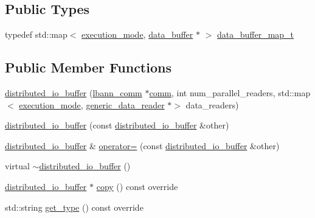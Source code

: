 \subsection*{Public Types}
\begin{DoxyCompactItemize}
\item 
typedef std\+::map$<$ \hyperlink{base_8hpp_a2781a159088df64ed7d47cc91c4dc0a8}{execution\+\_\+mode}, \hyperlink{classlbann_1_1data__buffer}{data\+\_\+buffer} $\ast$ $>$ \hyperlink{classlbann_1_1distributed__io__buffer_a7567d3d06f96b001c118f9979bebb0b9}{data\+\_\+buffer\+\_\+map\+\_\+t}
\end{DoxyCompactItemize}
\subsection*{Public Member Functions}
\begin{DoxyCompactItemize}
\item 
\hyperlink{classlbann_1_1distributed__io__buffer_a2066033e844ec7b9b95dfe7615a0a256}{distributed\+\_\+io\+\_\+buffer} (\hyperlink{classlbann_1_1lbann__comm}{lbann\+\_\+comm} $\ast$\hyperlink{file__io_8cpp_ab048c6f9fcbcfaa57ce68b00263dbebe}{comm}, int num\+\_\+parallel\+\_\+readers, std\+::map$<$ \hyperlink{base_8hpp_a2781a159088df64ed7d47cc91c4dc0a8}{execution\+\_\+mode}, \hyperlink{classlbann_1_1generic__data__reader}{generic\+\_\+data\+\_\+reader} $\ast$$>$ data\+\_\+readers)
\item 
\hyperlink{classlbann_1_1distributed__io__buffer_a245c5c4a6ed1af66abc97314031a4c24}{distributed\+\_\+io\+\_\+buffer} (const \hyperlink{classlbann_1_1distributed__io__buffer}{distributed\+\_\+io\+\_\+buffer} \&other)
\item 
\hyperlink{classlbann_1_1distributed__io__buffer}{distributed\+\_\+io\+\_\+buffer} \& \hyperlink{classlbann_1_1distributed__io__buffer_a021724e36cc803bb8dabd747d1f49035}{operator=} (const \hyperlink{classlbann_1_1distributed__io__buffer}{distributed\+\_\+io\+\_\+buffer} \&other)
\item 
virtual \hyperlink{classlbann_1_1distributed__io__buffer_ad55b621729dc0bfea498af2c232dc43c}{$\sim$distributed\+\_\+io\+\_\+buffer} ()
\item 
\hyperlink{classlbann_1_1distributed__io__buffer}{distributed\+\_\+io\+\_\+buffer} $\ast$ \hyperlink{classlbann_1_1distributed__io__buffer_a86a931528aa7a6e178cf6b55bf153881}{copy} () const override
\item 
std\+::string \hyperlink{classlbann_1_1distributed__io__buffer_a58e30ff6d96678b35b2470e1d292967c}{get\+\_\+type} () const override
$$
\end{DoxyCompactItemize}
